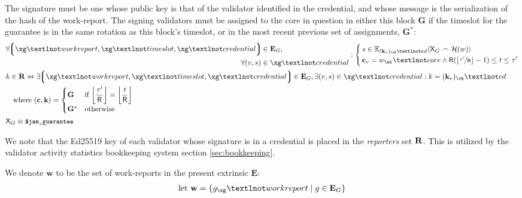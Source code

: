 The signature must be one whose public key is that of the validator identified in the credential, and whose message is the serialization of the hash of the work-report. The signing validators must be assigned to the core in question in either this block $\mathbf{G}$ if the timeslot for the guarantee is in the same rotation as this block's timeslot, or in the most recent previous set of assignments, $\mathbf{G}^*$:
\begin{align}\label{eq:guarantorsig}
  &\begin{aligned}
    &\begin{aligned}
      \forall \tup{\xg¬workreport, \xg¬timeslot, \xg¬credential} &\in \xtguarantees,\\
      \forall (v, s) &\in \xg¬credential
    \end{aligned}
      : \left\{\,\begin{aligned}
        &s \in \sig{(\mathbf{k}\sub{v})_\vk¬ed}{\mathsf{X}_G\concat\blake(w)}\\
        &\mathbf{c}\sub{v} = w_\wr¬core \wedge \mathsf{R}(\floor{\nicefrac{\thetime'}{\mathsf{R}}} - 1) \le t \le \thetime'\\
      \end{aligned}\right.\\
      &k \in \reporters \Leftrightarrow \exists \tup{\xg¬workreport, \xg¬timeslot, \xg¬credential} \in \xtguarantees, \exists (v, s) \in \xg¬credential: k = (\mathbf{k}\sub{v})_\vk¬ed\\
      &\quad\where (\mathbf{c}, \mathbf{k}) = \begin{cases}
        \mathbf{G} &\when \displaystyle \ffrac{\thetime'}{\mathsf{R}} = \ffrac{t}{\mathsf{R}} \\
        \mathbf{G}^* &\otherwise
      \end{cases}
  \end{aligned}\\
  &\mathsf{X}_G \equiv \token{\$jam\_guarantee}
\end{align}

We note that the Ed25519 key of each validator whose signature is in a credential is placed in the \emph{reporters} set $\mathbf{R}$. This is utilized by the validator activity statistics bookkeeping system section \ref{sec:bookkeeping}.

We denote $\mathbf{w}$ to be the set of work-reports in the present extrinsic $\mathbf{E}$:
\begin{align}\label{eq:incomingworkreports}
  \text{let}\ \mathbf{w} = \{ g_\xg¬workreport \mid g \in \xtguarantees \}
\end{align}

